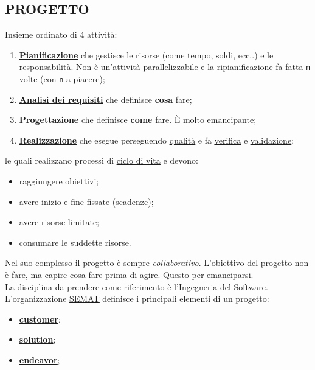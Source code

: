 		\subsection{PROGETTO}  \label{progetto}
		Insieme ordinato di 4 attività:
			\begin{enumerate}
				\item \underline{\hyperref[pianificazione]{\textbf{Pianificazione}}} che gestisce le risorse (come tempo, soldi, ecc..) e le responsabilità. Non è un'attività parallelizzabile e la ripianificazione fa fatta \texttt{n} volte (con \texttt{n} a piacere);
				\item \underline{\hyperref[analisideirequisiti]{\textbf{Analisi dei requisiti}}} che definisce \textbf{cosa} fare;
				\item \underline{\hyperref[progettazione]{\textbf{Progettazione}}} che definisce \textbf{come} fare. È molto emancipante;
				\item \underline{\hyperref[realizzazione]{\textbf{Realizzazione}}} che esegue perseguendo \underline{\hyperref[qualita]{qualità}} e fa \underline{\hyperref[verificare]{verifica}} e \underline{\hyperref[validare]{validazione}};
			\end{enumerate}	
		le quali realizzano processi di \underline{\hyperref[ciclo]{ciclo di vita}} e devono:
			\begin {itemize}
				\item raggiungere obiettivi;
				\item avere inizio e fine fissate (scadenze);
				\item avere risorse limitate;
				\item consumare le suddette risorse.
			\end {itemize}
		Nel suo complesso il progetto è sempre \textit{collaborativo}.
		L'obiettivo del progetto non è fare, ma capire cosa fare prima di agire. Questo per emanciparsi. \\
		La disciplina da prendere come riferimento è l'\underline{\hyperref[swe]{Ingegneria del Software}}.\\
		L'organizzazione \underline{\hyperref[semat]{SEMAT}} definisce i principali elementi di un progetto:
			\begin{itemize}
				\item \textbf{\underline{\hyperref[customer]{customer}}};
				\item \textbf{\underline{\hyperref[solution]{solution}}};
				\item \textbf{\underline{\hyperref[endeavor]{endeavor}}};
			\end{itemize}
		
